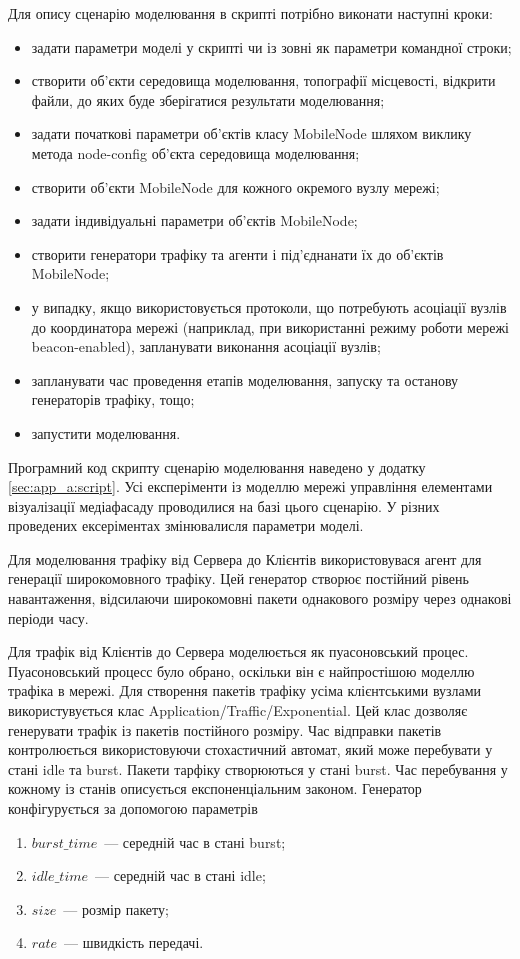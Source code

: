 \documentclass[a4paper,ukrainian,utf8,nocolumnsxix,floatsection,equationsection]{eskdtext}
\newcommand{\bem}[0]{beacon-enabled\xspace}
\begin{document}
Для опису сценарію моделювання в скрипті потрібно виконати наступні кроки:
\begin{itemize}
	\item задати параметри моделі у скрипті чи із зовні як параметри командної строки;
	\item створити об’єкти середовища моделювання, топографії місцевості, відкрити файли, до яких буде зберігатися результати  моделювання;
	\item задати початкові параметри об’єктів класу MobileNode шляхом виклику метода node-config об’єкта середовища моделювання;
	\item створити об’єкти MobileNode для кожного окремого вузлу мережі;
	\item задати індивідуальні параметри об’єктів MobileNode;
	\item створити генератори трафіку та агенти і під’єднанати їх до об’єктів MobileNode;
	\item у випадку, якщо використовується протоколи, що потребують асоціації вузлів до координатора мережі (наприклад, при використанні режиму роботи мережі \bem), запланувати виконання асоціації вузлів;
	\item запланувати час проведення етапів моделювання, запуску та останову генераторів трафіку, тощо;
	\item запустити моделювання.
\end{itemize}

Програмний код скрипту сценарію моделювання наведено у додатку \ref{sec:app_a:script}. Усі експеріменти із моделлю мережі управління елементами візуалізації медіафасаду проводилися на базі цього сценарію. У різних проведених ексеріментах змінювалисля параметри моделі.

Для моделювання трафіку від Сервера до Клієнтів використовувася агент для генерації широкомовного трафіку. Цей генератор створює постійний рівень навантаження, відсилаючи широкомовні пакети однакового розміру через однакові періоди часу.

Для трафік від Клієнтів до Сервера моделюється як пуасоновський процес. Пуасоновський процесс було обрано, оскільки він є найпростішою моделлю трафіка в мережі. Для створення пакетів трафіку усіма клієнтськими вузлами використувується клас Application/Traffic/Exponential. Цей клас дозволяє генерувати трафік із пакетів постійного розміру. Час відправки пакетів контролюється використовуючи стохастичний автомат, який може перебувати у стані idle та burst. Пакети тарфіку створюються у стані burst. Час перебування у кожному із станів описується експоненціальним законом. Генератор конфігурується за допомогою параметрів 
\begin{enumerate}
	\item $burst\_time$~--- середній час в стані burst;
	\item $idle\_time$~--- середній час в стані idle;
	\item $size$~--- розмір пакету;
	\item $rate$~--- швидкість передачі.
\end{enumerate}
\end{document}
